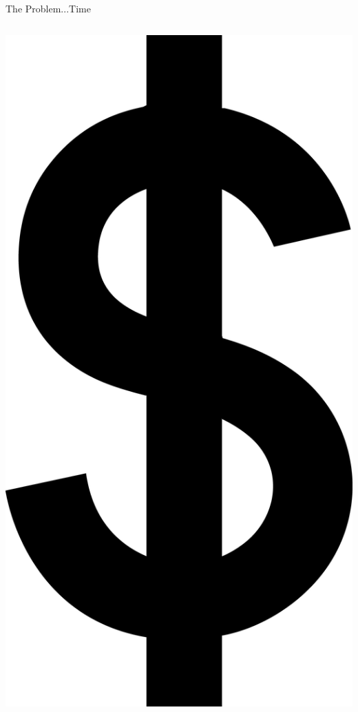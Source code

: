 \documentclass{beamer}
\begin{document}
\begin{frame}{The Problem...Time}
\begin{columns}
\begin{column}{0.5\textwidth}
\includegraphics[scale=0.02]{Pictures/Dollarsign.png}


\end{column}
\end{columns}
\end{frame}
\end{document}
